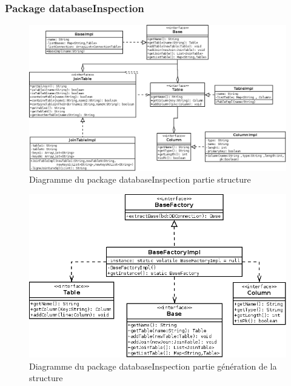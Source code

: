 \documentclass[12pt]{report}
\begin{document}
\subsubsection*{Package databaseInspection}
\begin{figure}[h!]
\begin{center}
\includegraphics[scale=0.4]{bduml/structDataBase.png}
\caption{Diagramme du package databaseInspection partie structure}
\end{center}
\end{figure}

\begin{figure}[h!]
\begin{center}
\includegraphics[scale=0.5]{bduml/baseFactory.png}
\caption{Diagramme du package databaseInspection partie génération de la structure}
\end{center}
\end{figure}
\end{document}
